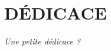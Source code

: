 \chapter*{DÉDICACE}
\addtocounter{page}{-1}
\thispagestyle{headings}

\begin{flushright}
    \itshape
    Une petite dédicace ?
\end{flushright}

